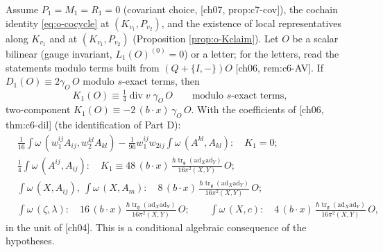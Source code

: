 \begin{theorem}[$K_1$ from $D_1$]
\label{thm:o-KD}
Assume $P_1=M_1=R_1=0$ (covariant choice, [ch07, prop:c7-cov]), the cochain identity \eqref{eq:o-cocycle} at $(K_{v_1},P_{v_2})$, and the existence of local representatives along $K_{v_1}$ and at $(K_{v_1},P_{v_2})$ (Proposition \ref{prop:o-Kclaim}). Let $O$ be a scalar bilinear (gauge invariant, $L_1(O)^{(0)}=0$) or a letter; for the letters, read the statements modulo terms built from $(Q+\{I,-\})O$ [ch06, rem:c6-AV]. If $D_1(O)\equiv2\gamma_O\,O$ modulo $s$-exact terms, then
\begin{equation}
K_1(O)\equiv\tfrac14\operatorname{div}v\;\gamma_O\,O\qquad\text{modulo }s\text{-exact terms},
\label{eq:o-KD}
\end{equation}
two-component $K_1(O)\equiv-2\,(b\cdot x)\,\gamma_O\,O$. With the coefficients of [ch06, thm:c6-dil] (the identification of Part D):
\[
\begin{aligned}
&\tfrac{1}{16}\int\omega\,(w_1^{ij}A_{ij},w_2^{kl}A_{kl})-\tfrac1{96}w_1^{ij}w_{2ij}\int\omega\,(A^{kl},A_{kl}):\quad K_1=0;\\
&\tfrac14\int\omega\,(A^{ij},A_{ij}):\quad K_1\equiv48\,(b\cdot x)\,\tfrac{\hbar\operatorname{tr}_{\mathfrak g}(\mathrm{ad}_X\mathrm{ad}_Y)}{16\pi^2(X,Y)}\,O;\\
&\int\omega\,(X,A_{ij}),\ \int\omega\,(X,A_m):\quad 8\,(b\cdot x)\,\tfrac{\hbar\operatorname{tr}_{\mathfrak g}(\mathrm{ad}_X\mathrm{ad}_Y)}{16\pi^2(X,Y)}\,O;\\
&\int\omega\,(\zeta,\lambda):\quad 16\,(b\cdot x)\,\tfrac{\hbar\operatorname{tr}_{\mathfrak g}(\mathrm{ad}_X\mathrm{ad}_Y)}{16\pi^2(X,Y)}\,O;\qquad \int\omega\,(X,c):\quad 4\,(b\cdot x)\,\tfrac{\hbar\operatorname{tr}_{\mathfrak g}(\mathrm{ad}_X\mathrm{ad}_Y)}{16\pi^2(X,Y)}\,O,
\end{aligned}
\]
in the unit of [ch04]. This is a conditional algebraic consequence of the hypotheses.
\end{theorem}

